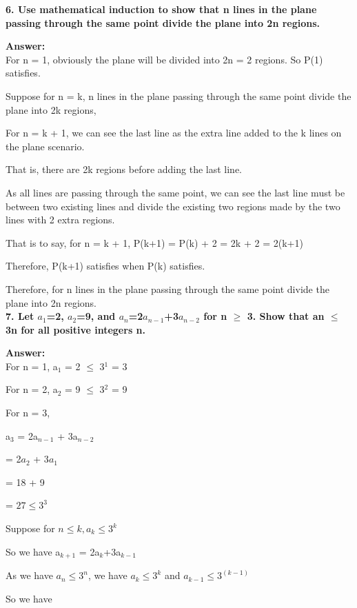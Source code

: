 \documentclass{article}
\begin{document}
\begin{large}
\textbf{6. Use mathematical induction to show that n lines in the plane passing through the same point divide the plane into 2n regions.}

\textbf{Answer:}\\


For n = 1, obviously the plane will be divided into 2n = 2 regions. So P(1) satisfies.

Suppose for n = k, n lines in the plane passing through the same point divide the plane into 2k regions,

For n = k + 1, we can see the last line as the extra line added to the k lines on the plane scenario. 

That is, there are 2k regions before adding the last line.

As all lines are passing through the same point, we can see the last line must be between two existing lines and divide the existing two regions made by the two lines with 2 extra regions.

That is to say, for n = k + 1, P(k+1) = P(k) + 2 = 2k + 2 = 2(k+1)

Therefore, P(k+1) satisfies when P(k) satisfies.

Therefore, for n lines in the plane passing through the same point divide the plane into 2n regions.\\

\textbf{7. Let $a_{1}$=2, $a_{2}$=9, and $a_{n}$=2$a_{n-1}$+3$a_{n-2}$ for n $\ge$ 3. Show that an $\le$ 3n for all positive integers n. }

\textbf{Answer:}\\


For n = 1, a$_{1}$ = 2 $\le$ 3$^{1}$ = 3

For n = 2, a$_{2}$ = 9 $\le$ 3$^{2}$ = 9

For n = 3, 

a$_{3}$ = 2a$_{n-1}$ + 3a$_{n-2}$

\indent\indent                   = 2$a_{2}$ + 3$a_{1}$
                   
\indent\indent                   = 18 + 9
                   
 \indent\indent               = $27 \le 3^3$

Suppose for $n \le k, a_{k} \le 3^k$

So we have a$_{k+1}$ = 2a$_{k}$+3a$_{k-1}$ 

As we have $a_{n} \le 3^n$, we have $a_{k} \le 3^k$ and $a_{k-1} \le 3^(k-1)$

So we have 


\end{large}
\end{document}
